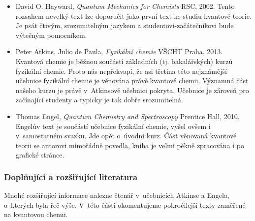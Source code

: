 \begin{itemize}

\item David O. Hayward, \textit{Quantum Mechanics for Chemists} RSC, 2002. Tento rozsahem nevelký text lze doporučit jako první text ke studiu kvantové teorie. Je psát čtivým, srozumitelným jazykem a studentovi-začátečníkovi bude výtečným pomocníkem.   
\item Peter Atkins, Julio de Paula, \textit{Fyzikální chemie} VŠCHT Praha, 2013. Kvantová chemie je běžnou součástí základních (tj. bakalářských) kurzů fyzikální chemie. Proto nás nepřekvapí, že asi třetina této nejznámější učebnice fyzikální chemie je věnována právě kvantové chemii. Významná část našeho kurzu je právě v~Atkinsově učebnici pokryta. Učebnice je zároveň pro začínající studenty a typicky je tak dobře srozumitelná.
\item Thomas Engel, \textit{Quantum Chemistry and Spectroscopy} Prentice Hall, 2010. Engelův text je součástí učebnice fyzikální chemie, vyšel ovšem i v~samostatném svazku. Jde opět o~úvodní kurz. Část věnovaná kvantové teorii se autorovi mimořádně povedla, kniha je velmi pěkně zpracována i po grafické stránce. 
\end{itemize}


\subsubsection{Doplňující a rozšiřující literatura}
Mnohé rozšiřující informace nalezne čtenář v~učebnicích Atkinse a Engela, o~kterých byla řeč výše. V~této části okomentujeme pokročilejší texty zaměřené na kvantovou chemii.
 
